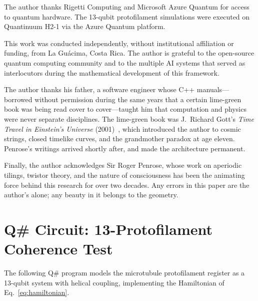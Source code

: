 \documentclass[12pt,a4paper]{article}
\theoremstyle{plain}
\theoremstyle{definition}
\begin{document}
The author thanks Rigetti Computing and Microsoft Azure Quantum for access to quantum hardware. The 13-qubit protofilament simulations were executed on Quantinuum H2-1 via the Azure Quantum platform.

This work was conducted independently, without institutional affiliation or funding, from La Gu\'acima, Costa Rica. The author is grateful to the open-source quantum computing community and to the multiple AI systems that served as interlocutors during the mathematical development of this framework.

The author thanks his father, a software engineer whose C++ manuals---borrowed without permission during the same years that a certain lime-green book was being read cover to cover---taught him that computation and physics were never separate disciplines. The lime-green book was J.~Richard Gott's \textit{Time Travel in Einstein's Universe} (2001)~\cite{gott2001}, which introduced the author to cosmic strings, closed timelike curves, and the grandmother paradox at age eleven. Penrose's writings arrived shortly after, and made the architecture permanent.

Finally, the author acknowledges Sir Roger Penrose, whose work on aperiodic tilings, twistor theory, and the nature of consciousness has been the animating force behind this research for over two decades. Any errors in this paper are the author's alone; any beauty in it belongs to the geometry.

\appendix

\section{Q\# Circuit: 13-Protofilament Coherence Test}
\label{app:qsharp}

The following Q\# program models the microtubule protofilament register as a 13-qubit system with helical coupling, implementing the Hamiltonian of Eq.~\ref{eq:hamiltonian}.
\end{document}
